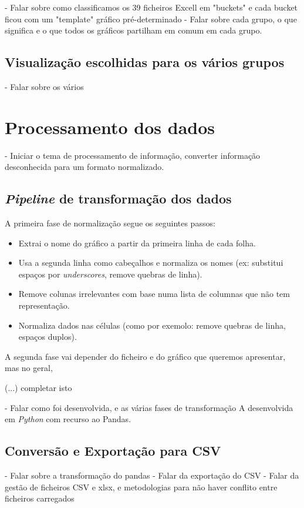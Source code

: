 - Falar sobre como classificamos os 39 ficheiros Excell em "buckets" e cada bucket ficou com um "template" gráfico pré-determinado
- Falar sobre cada grupo, o que significa e o que todos os gráficos partilham em comum em cada grupo.

\subsection{Visualização escolhidas para os vários grupos}
- Falar sobre os vários

\section{Processamento dos dados}
- Iniciar o tema de processamento de informação, converter informação desconhecida para um formato normalizado.

\subsection{\textit{Pipeline} de transformação dos dados}
A primeira fase de normalização segue os seguintes passos:
\begin{itemize}
    \item Extrai o nome do gráfico a partir da primeira linha de cada folha.
    \item Usa a segunda linha como cabeçalhos e normaliza os nomes (ex: substitui espaços por \textit{underscores}, remove quebras de linha).
    \item Remove colunas irrelevantes com base numa lista de columnas que não tem representação.
    \item Normaliza dados nas células (como por exemolo: remove quebras de linha, espaços duplos).
\end{itemize}

A segunda fase vai depender do ficheiro e do gráfico que queremos apresentar, mas no geral,

(...) completar isto

- Falar como foi desenvolvida, e as várias fases  de transformação A desenvolvida em \textit{Python} com recurso ao Pandas. 


\subsection{Conversão e Exportação para CSV}
- Falar sobre a transformação do pandas\n
- Falar da exportação do CSV\n
- Falar da gestão de ficheiros  CSV e \gls{xlsx}, e metodologias para não haver conflito entre ficheiros carregados\n



